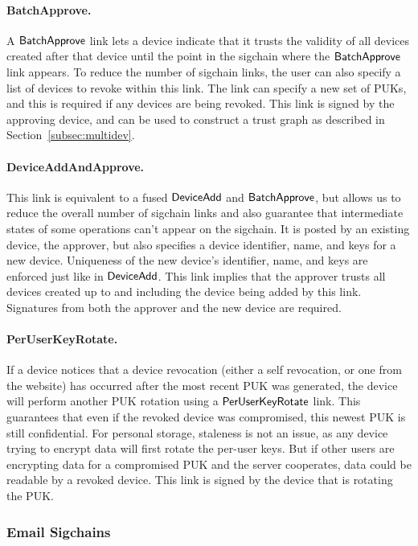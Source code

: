 \paragraph{BatchApprove.} A $\mathsf{BatchApprove}{}$ link lets a device indicate that it trusts the
validity of all devices created after that device until the point in the sigchain where the
$\mathsf{BatchApprove}{}$ link appears. To reduce the number of sigchain links, the user can also specify a
list of devices to revoke within this link. The link can specify a new set of PUKs, and this is
required if any devices are being revoked. This link is signed by the approving device, and can be
used to construct a trust graph as described in Section~\ref{subsec:multidev}.

\paragraph{DeviceAddAndApprove.} This link is equivalent to a fused $\mathsf{DeviceAdd}{}$ and
$\mathsf{BatchApprove}{}$, but allows us to reduce the overall number of sigchain links and also guarantee
that intermediate states of some operations can't appear on the sigchain. It is posted by an
existing device, the approver, but also specifies a device identifier, name, and keys for a new
device. Uniqueness of the new device's identifier, name, and keys are enforced just like in
$\mathsf{DeviceAdd}{}$. This link implies that the approver trusts all devices created up to and including
the device being added by this link. Signatures from both the approver and the new device are
required.

\paragraph{PerUserKeyRotate.} If a device notices that a device revocation (either a self
revocation, or one from the website) has occurred after the most recent PUK was generated, the device
will perform another PUK rotation using a $\mathsf{PerUserKeyRotate}{}$ link. This guarantees that even if
the revoked device was compromised, this newest PUK is still confidential. For personal storage,
staleness is not an issue, as any device trying to encrypt data will first rotate the per-user keys.
But if other users are encrypting data for a compromised PUK and the server cooperates, data could
be readable by a revoked device. This link is signed by the device that is rotating the PUK.

\subsubsection{Email Sigchains}

